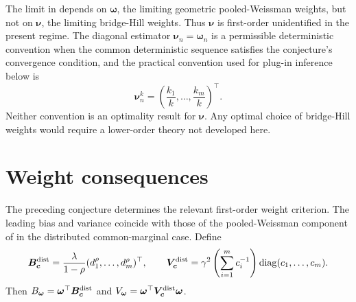 \begin{remark}
\label{rem:pool-ext:nu-unidentified}
The limit in  depends on
\(\bm\omega\), the limiting geometric pooled-Weissman weights, but not on
\(\bm\nu\), the limiting bridge-Hill weights. Thus \(\bm\nu\) is first-order
unidentified in the present regime. The diagonal estimator
\(\bm\nu_n=\bm\omega_n\) is a permissible deterministic convention when the
common deterministic sequence satisfies the conjecture's convergence condition,
and the practical convention used for plug-in inference below is
\[
  \bm\nu_n^k=\left(\frac{k_1}{k},\ldots,\frac{k_m}{k}\right)^\top.
\]
Neither convention is an optimality result for \(\bm\nu\). Any optimal choice
of bridge-Hill weights would require a lower-order theory not developed here.
\end{remark}

\section{Weight consequences}
\label{sec:pool-ext:weights}

The preceding conjecture determines the relevant first-order weight criterion.
The leading bias and variance coincide with those of the
pooled-Weissman component of \textcite[Corollary~8]{DaouiaPadoanStupfler2021}
in the distributed common-marginal case. Define
\[
  \bm{B}_{\bm{c}}^{\mathrm{dist}}
  =
  \frac{\lambda}{1-\rho}
  (d_1^\rho,\ldots,d_m^\rho)^\top,
  \qquad
  \bm{V}_{\bm{c}}^{\mathrm{dist}}
  =
  \gamma^2
  \left(\sum_{i=1}^{m}c_i^{-1}\right)
  \operatorname{diag}(c_1,\ldots,c_m).
\]
Then \(B_{\bm\omega}=\bm\omega^\top\bm{B}_{\bm{c}}^{\mathrm{dist}}\) and
\(V_{\bm\omega}=\bm\omega^\top\bm{V}_{\bm{c}}^{\mathrm{dist}}\bm\omega\).

